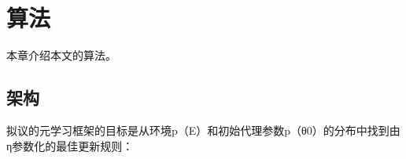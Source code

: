 \chapter{算法}
\label{cha:usage-example}

本章介绍本文的算法。

\section{架构}

拟议的元学习框架的目标是从环境p（E）和初始代理参数p（θ0）的分布中找到由η参数化的最佳更新规则：
